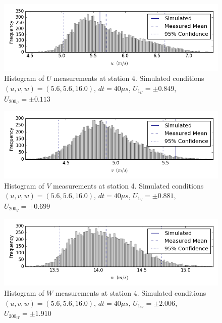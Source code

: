 \begin{figure}[H]
\centering
\includegraphics[width=6in]{figs/Ely_May28th04002/uncertainty_Ely_May28th04002_U}
\caption{Histogram of $U$ measurements at station 4. Simulated conditions $(u,v,w)=(5.6, 5.6, 16.0)$, $dt=40 \mu s$, $U_1_U=\pm 0.849$, $U_200_U=\pm 0.113$}
\label{fig:uncertainty_Ely_May28th04002_U}
\end{figure}


\begin{figure}[H]
\centering
\includegraphics[width=6in]{figs/Ely_May28th04002/uncertainty_Ely_May28th04002_V}
\caption{Histogram of $V$ measurements at station 4. Simulated conditions $(u,v,w)=(5.6, 5.6, 16.0)$, $dt=40 \mu s$, $U_1_V=\pm 0.881$, $U_200_V=\pm 0.699$}
\label{fig:uncertainty_Ely_May28th04002_V}
\end{figure}


\begin{figure}[H]
\centering
\includegraphics[width=6in]{figs/Ely_May28th04002/uncertainty_Ely_May28th04002_W}
\caption{Histogram of $W$ measurements at station 4. Simulated conditions $(u,v,w)=(5.6, 5.6, 16.0)$, $dt=40 \mu s$, $U_1_W=\pm 2.006$, $U_200_W=\pm 1.910$}
\label{fig:uncertainty_Ely_May28th04002_W}
\end{figure}



